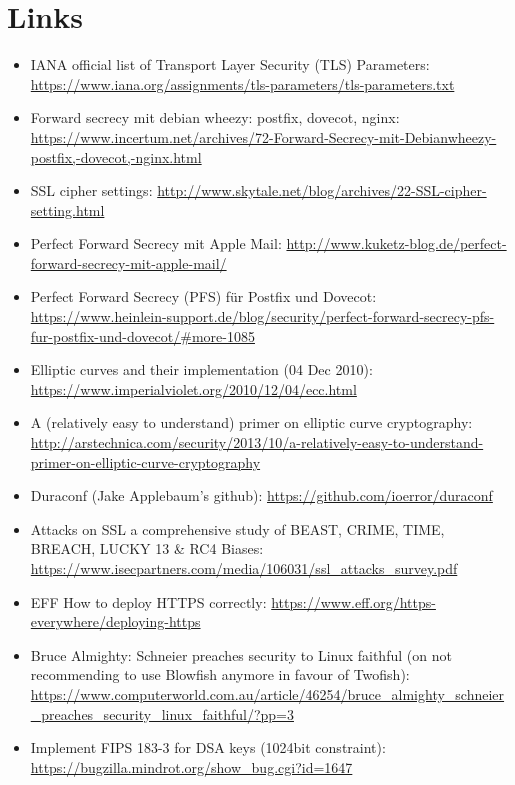 \section{Links}



\begin{itemize}
\item IANA official list of Transport Layer Security (TLS) Parameters: \url{https://www.iana.org/assignments/tls-parameters/tls-parameters.txt}
\item Forward secrecy mit debian wheezy: postfix, dovecot, nginx: \url{https://www.incertum.net/archives/72-Forward-Secrecy-mit-Debianwheezy-postfix,-dovecot,-nginx.html}
\item SSL cipher settings: \url{http://www.skytale.net/blog/archives/22-SSL-cipher-setting.html}
\item Perfect Forward Secrecy mit Apple Mail: \url{http://www.kuketz-blog.de/perfect-forward-secrecy-mit-apple-mail/}
\item Perfect Forward Secrecy (PFS) f\"ur Postfix und Dovecot: \url{https://www.heinlein-support.de/blog/security/perfect-forward-secrecy-pfs-fur-postfix-und-dovecot/#more-1085}
\item Elliptic curves and their implementation (04 Dec 2010): \url{https://www.imperialviolet.org/2010/12/04/ecc.html}
\item A (relatively easy to understand) primer on elliptic curve cryptography: \url{http://arstechnica.com/security/2013/10/a-relatively-easy-to-understand-primer-on-elliptic-curve-cryptography}
\item Duraconf (Jake Applebaum's github): \url{https://github.com/ioerror/duraconf}
\item Attacks on SSL a comprehensive study of BEAST, CRIME, TIME, BREACH, LUCKY 13 \& RC4 Biases: \url{https://www.isecpartners.com/media/106031/ssl_attacks_survey.pdf}
\item EFF How to deploy HTTPS correctly: \url{https://www.eff.org/https-everywhere/deploying-https}
\item Bruce Almighty: Schneier preaches security to Linux faithful (on not recommending to use Blowfish anymore in favour of Twofish): \url{https://www.computerworld.com.au/article/46254/bruce_almighty_schneier_preaches_security_linux_faithful/?pp=3}
\item Implement FIPS 183-3 for DSA keys (1024bit constraint): \url{https://bugzilla.mindrot.org/show_bug.cgi?id=1647}
\end{itemize}
